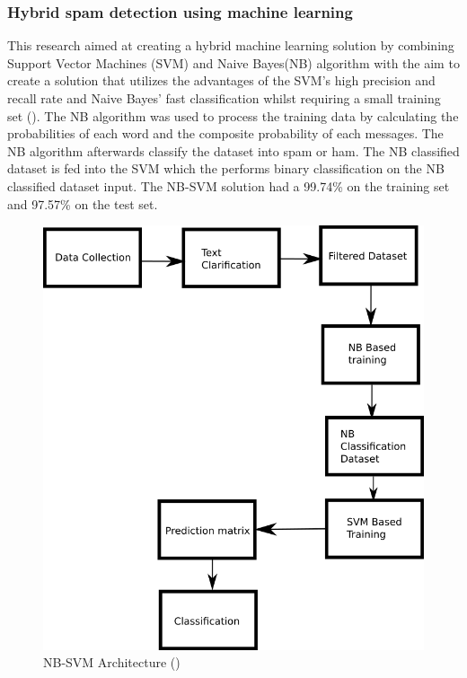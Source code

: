 \subsubsection{Hybrid spam detection using machine learning}
This research aimed at creating a hybrid machine learning solution by combining Support Vector Machines (SVM) and Naive Bayes(NB) algorithm with the aim to create a solution that utilizes the advantages of the SVM's high precision and recall rate and Naive Bayes' fast classification whilst requiring a small training set (\cite{hybrid_2018}). The NB algorithm was used to process the training data by calculating the probabilities of each word and the composite probability of each messages. The NB algorithm afterwards classify the dataset into spam or ham. The NB classified dataset is fed into the SVM which the performs binary classification on the NB classified dataset input. The NB-SVM solution had a 99.74\% on the training set and 97.57\% on the test set.

\begin{figure}[H]
    \centering
    \includegraphics[width=13cm]{img/hybrid.png}
    \caption{NB-SVM Architecture (\cite{hybrid_2018})}
    \label{fig:hybrid_img}
\end{figure}